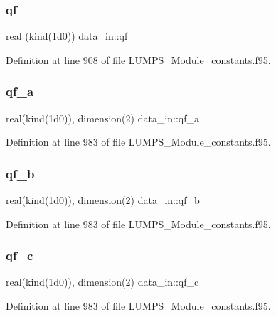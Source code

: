 \subsubsection{\texorpdfstring{qf}{qf}}
{\footnotesize\ttfamily real (kind(1d0)) data\+\_\+in\+::qf}



Definition at line 908 of file L\+U\+M\+P\+S\+\_\+\+Module\+\_\+constants.\+f95.

\mbox{\label{namespacedata__in_a44d4947885c1f0f8cd0924c7147d084b}} 
\subsubsection{\texorpdfstring{qf\+\_\+a}{qf\_a}}
{\footnotesize\ttfamily real(kind(1d0)), dimension(2) data\+\_\+in\+::qf\+\_\+a}



Definition at line 983 of file L\+U\+M\+P\+S\+\_\+\+Module\+\_\+constants.\+f95.

\mbox{\label{namespacedata__in_ac8582577b56253d36f68dcc213c7bfa4}} 
\subsubsection{\texorpdfstring{qf\+\_\+b}{qf\_b}}
{\footnotesize\ttfamily real(kind(1d0)), dimension(2) data\+\_\+in\+::qf\+\_\+b}



Definition at line 983 of file L\+U\+M\+P\+S\+\_\+\+Module\+\_\+constants.\+f95.

\mbox{\label{namespacedata__in_aac91e60fdee7233d397c1fdbfcd65505}} 
\subsubsection{\texorpdfstring{qf\+\_\+c}{qf\_c}}
{\footnotesize\ttfamily real(kind(1d0)), dimension(2) data\+\_\+in\+::qf\+\_\+c}



Definition at line 983 of file L\+U\+M\+P\+S\+\_\+\+Module\+\_\+constants.\+f95.

